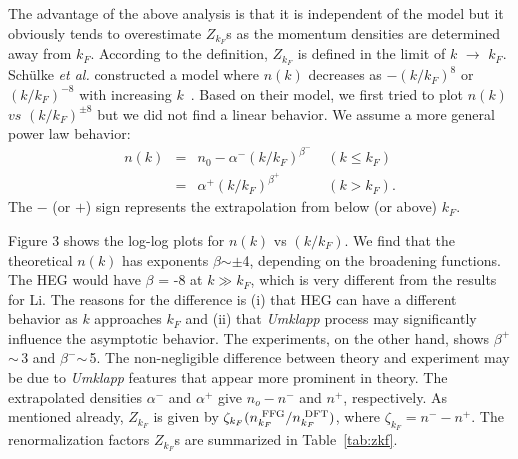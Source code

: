 \documentclass[twocolumn,showpacs,showkeys,fleqn,prl,superscriptaddress]{revtex4}%
\newcommand{\nn}[1]{\textnormal{ #1}}
\newcommand{\ii}[1]{\textit{#1}}
\begin{document}
The advantage of the above analysis is that it is independent of the model but it obviously tends to overestimate $Z_{k_F}$s as the momentum densities are determined away from $k_F$.
According to the definition, $Z_{k_F}$ is defined in the limit of $k$ $\to$ $k_F$.
Sch{\"u}lke \ii{et al.}\,\,constructed a model where $n(k)$ decreases as $-(k/k_F)^{8}$ or $(k/k_F)^{-8}$ with increasing $k$~\cite{schulke96}.
Based on their model, we first tried to plot $n(k)$ $vs$ $(k/k_F)^{\pm 8}$ but we did not find a linear behavior.
We assume a more general  power law behavior:
\begin{eqnarray}
n(k) &=& n_0 - \alpha^{-}  (k/k_F)^{\beta^-}  \;\;\;\; (k \leq k_F)  \nonumber \\
&=&  \alpha^{+}  (k/k_F)^{\beta^+}  \;\;\;\;\;\;\;\;\;\;\;\; (k>k_F).
\end{eqnarray}
The $-$ (or $+$) sign represents the extrapolation from  below (or above) $k_F$.

Figure 3 shows the log-log plots for $n(k)$ vs $(k/k_F)$. %
We find that the theoretical $n(k)$ has  exponents $\beta$$\sim\pm$4, depending on the broadening functions.
The HEG  would have $\beta$ = -8 at $k \gg k_F$, which is very different from the results for Li.
The reasons for the difference is (i) that HEG can have a different behavior as $k$ approaches $k_F$ and (ii) that {\it Umklapp} process may significantly influence the asymptotic behavior.
The experiments, on the other hand, shows $\beta^+$$\sim\,$3 and $\beta^-$$\sim\,$5.
The non-negligible difference between theory and experiment may be due to {\it Umklapp} features that appear more prominent in theory.
The extrapolated densities $\alpha^-$ and $\alpha^+$ give $n_o - n^-$ and $n^+$, respectively.
As mentioned already,  $Z_{k_F}$ is given by $\zeta_{k_F} (n_{k_F}^{\nn{FFG}}/n_{k_F}^{\nn{DFT}})$, where $\zeta_{k_F}= n^- - n^+$.   
The renormalization factors $Z_{k_F}$s are summarized in %
Table~\ref{tab:zkf}.
\end{document}
